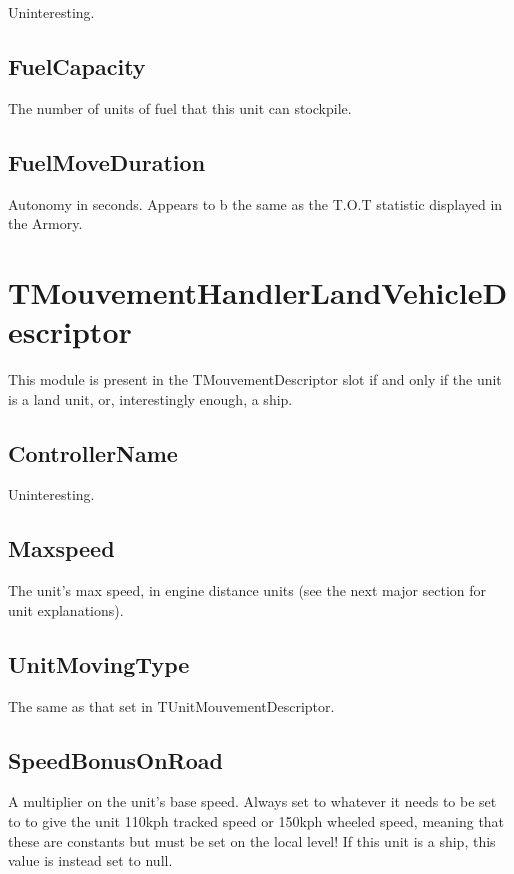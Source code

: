 \documentclass{article}
\begin{document}
Uninteresting.

\subsection{FuelCapacity}

The number of units of fuel that this unit can stockpile.

\subsection{FuelMoveDuration}

Autonomy in seconds. Appears to b the same as the T.O.T statistic displayed in the Armory.

\section{TMouvementHandlerLandVehicleDescriptor}

This module is present in the TMouvementDescriptor slot if and only if the unit is a land unit, or, interestingly enough, a ship.

\subsection{ControllerName}

Uninteresting.

\subsection{Maxspeed}

The unit's max speed, in engine distance units (see the next major section for unit explanations).

\subsection{UnitMovingType}

The same as that set in TUnitMouvementDescriptor.

\subsection{SpeedBonusOnRoad}

A multiplier on the unit's base speed. Always set to whatever it needs to be set to to give the unit 110kph tracked speed or 150kph wheeled speed, meaning that these are constants but must be set on the local level! If this unit is a ship, this value is instead set to null.
\end{document}
